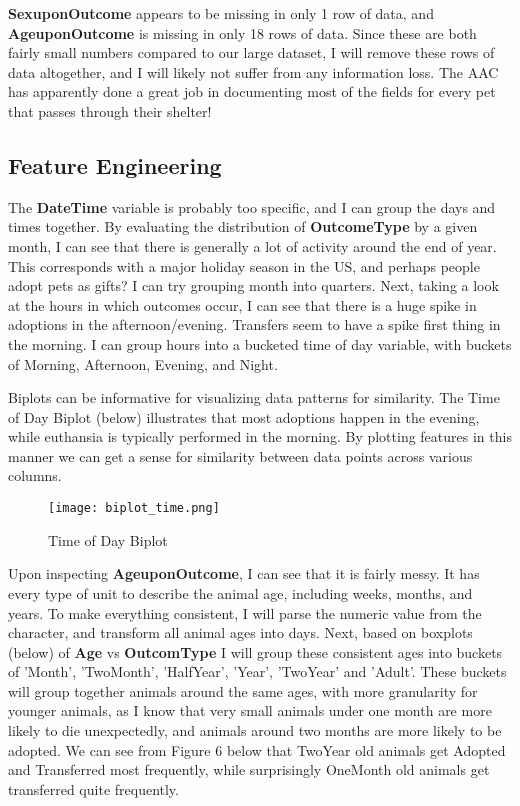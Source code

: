 \documentclass[12pt]{article} %
\begin{document}
\textbf{SexuponOutcome} appears to be missing in only 1 row of data, and \textbf{AgeuponOutcome} is missing in only 18 rows of data. Since these are both fairly small numbers compared to our large dataset, I will remove these rows of data altogether, and I will likely not suffer from any information loss. The AAC has apparently done a great job in documenting most of the fields for every pet that passes through their shelter!

\subsection{Feature Engineering} 

The \textbf{DateTime} variable is probably too specific, and I can group the days and times together. By evaluating the distribution of \textbf{OutcomeType} by a given month, I can see that there is generally a lot of activity around the end of year. This corresponds with a major holiday season in the US, and perhaps people adopt pets as gifts? I can try grouping month into quarters. Next, taking a look at the hours in which outcomes occur, I can see that there is a huge spike in adoptions in the afternoon/evening. Transfers seem to have a spike first thing in the morning. I can group hours into a bucketed time of day variable, with buckets of Morning, Afternoon, Evening, and Night. 

Biplots can be informative for visualizing data patterns for similarity. The Time of Day Biplot (below) illustrates that most adoptions happen in the evening, while euthansia is typically performed in the morning. By plotting features in this manner we can get a sense for similarity between data points across various columns.

\begin{figure}[h!]
  \centering
  \texttt{[image: biplot\_time.png]}                  
  \caption{Time of Day Biplot}
  \label{fig:OutcomeType}
\end{figure}
\newpage


Upon inspecting \textbf{AgeuponOutcome}, I can see that it is fairly messy. It has every type of unit to describe the animal age, including weeks, months, and years. To make everything consistent, I will parse the numeric value from the character, and transform all animal ages into days. Next, based on boxplots (below) of \textbf{Age} vs \textbf{OutcomType} I will group these consistent ages into buckets of 'Month', 'TwoMonth', 'HalfYear', 'Year', 'TwoYear' and 'Adult'. These buckets will group together animals around the same ages, with more granularity for younger animals, as I know that very small animals under one month are more likely to die unexpectedly, and animals around two months are more likely to be adopted. We can see from Figure 6 below that TwoYear old animals get Adopted and Transferred most frequently, while surprisingly OneMonth old animals get transferred quite frequently. 
\end{document}
